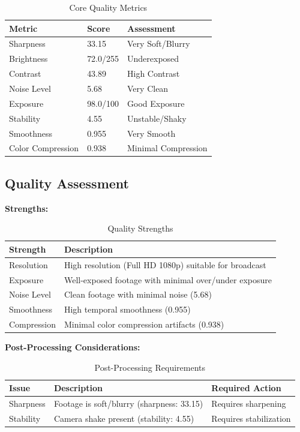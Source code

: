 \documentclass[
  11pt,
]{article}
\begin{document}
\begin{table}[h]
\centering
\small
\caption{Core Quality Metrics}
\label{tab-quality-metrics}
\begin{tabular}{p{3.5cm}p{2cm}p{5.5cm}}
\toprule
\textbf{Metric} & \textbf{Score} & \textbf{Assessment} \\
\midrule
Sharpness & 33.15 & Very Soft/Blurry \\
Brightness & 72.0/255 & Underexposed \\
Contrast & 43.89 & High Contrast \\
Noise Level & 5.68 & Very Clean \\
Exposure & 98.0/100 & Good Exposure \\
Stability & 4.55 & Unstable/Shaky \\
Smoothness & 0.955 & Very Smooth \\
Color Compression & 0.938 & Minimal Compression \\
\bottomrule
\end{tabular}
\end{table}

\needspace{12cm}
\subsection{Quality Assessment}

\textbf{Strengths:}

\begin{table}[h]
\centering
\small
\caption{Quality Strengths}
\label{tab-strengths}
\begin{tabular}{p{2cm}p{7cm}}
\toprule
\textbf{Strength} & \textbf{Description} \\
\midrule
Resolution & High resolution (Full HD 1080p) suitable for broadcast \\
Exposure & Well-exposed footage with minimal over/under exposure \\
Noise Level & Clean footage with minimal noise (5.68) \\
Smoothness & High temporal smoothness (0.955) \\
Compression & Minimal color compression artifacts (0.938) \\
\bottomrule
\end{tabular}
\end{table}

\textbf{Post-Processing Considerations:}

\begin{table}[h]
\centering
\small
\caption{Post-Processing Requirements}
\label{tab-post-processing}
\begin{tabular}{p{2cm}p{4cm}p{3cm}}
\toprule
\textbf{Issue} & \textbf{Description} & \textbf{Required Action} \\
\midrule
Sharpness & Footage is soft/blurry (sharpness: 33.15) & Requires sharpening \\
Stability & Camera shake present (stability: 4.55) & Requires stabilization \\
\bottomrule
\end{tabular}
\end{table}
\end{document}
